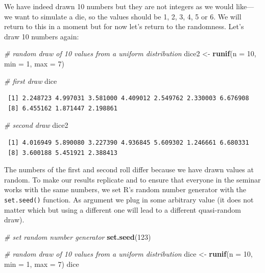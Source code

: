 \documentclass[]{article}
\newenvironment{Shaded}{\begin{snugshade}}{\end{snugshade}}
\newcommand{\KeywordTok}[1]{\textcolor[rgb]{0.13,0.29,0.53}{\textbf{#1}}}
\newcommand{\DataTypeTok}[1]{\textcolor[rgb]{0.13,0.29,0.53}{#1}}
\newcommand{\DecValTok}[1]{\textcolor[rgb]{0.00,0.00,0.81}{#1}}
\newcommand{\StringTok}[1]{\textcolor[rgb]{0.31,0.60,0.02}{#1}}
\newcommand{\CommentTok}[1]{\textcolor[rgb]{0.56,0.35,0.01}{\textit{#1}}}
\newcommand{\NormalTok}[1]{#1}
\theoremstyle{definition}
\theoremstyle{definition}
\theoremstyle{definition}
\theoremstyle{remark}
\begin{document}
We have indeed drawn 10 numbers but they are not integers as we would
like---we want to simulate a die, so the values should be 1, 2, 3, 4, 5
or 6. We will return to this in a moment but for now let's return to the
randomness. Let's draw 10 numbers again:

\begin{Shaded}
\begin{Highlighting}[]
\CommentTok{# random draw of 10 values from a uniform distribution}
\NormalTok{dice2 <-}\StringTok{ }\KeywordTok{runif}\NormalTok{(}\DataTypeTok{n =} \DecValTok{10}\NormalTok{, }\DataTypeTok{min =} \DecValTok{1}\NormalTok{, }\DataTypeTok{max =} \DecValTok{7}\NormalTok{)}

\CommentTok{# first draw}
\NormalTok{dice}
\end{Highlighting}
\end{Shaded}

\begin{verbatim}
 [1] 2.248723 4.997031 3.581000 4.409012 2.549762 2.330003 6.676908
 [8] 6.455162 1.871447 2.198861
\end{verbatim}

\begin{Shaded}
\begin{Highlighting}[]
\CommentTok{# second draw}
\NormalTok{dice2}
\end{Highlighting}
\end{Shaded}

\begin{verbatim}
 [1] 4.016949 5.890080 3.227390 4.936845 5.609302 1.246661 6.680331
 [8] 3.600188 5.451921 2.388413
\end{verbatim}

The numbers of the first and second roll differ because we have drawn
values at random. To make our results replicate and to ensure that
everyone in the seminar works with the same numbers, we set R's random
number generator with the \texttt{set.seed()} function. As argument we
plug in some arbitrary value (it does not matter which but using a
different one will lead to a different quasi-random draw).

\begin{Shaded}
\begin{Highlighting}[]
\CommentTok{# set random number generator}
\KeywordTok{set.seed}\NormalTok{(}\DecValTok{123}\NormalTok{)}

\CommentTok{# random draw of 10 values from a uniform distribution}
\NormalTok{dice <-}\StringTok{ }\KeywordTok{runif}\NormalTok{(}\DataTypeTok{n =} \DecValTok{10}\NormalTok{, }\DataTypeTok{min =} \DecValTok{1}\NormalTok{, }\DataTypeTok{max =} \DecValTok{7}\NormalTok{)}
\NormalTok{dice}
\end{Highlighting}
\end{Shaded}
\end{document}
